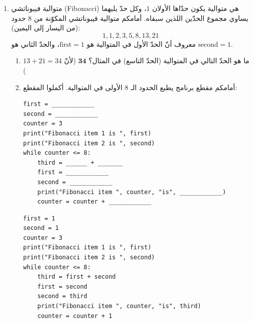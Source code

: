 \documentclass[14pt]{extarticle}
\begin{document}
\begin{enumerate}[label=\textbf{تمرين \arabic*:}, wide=0pt, itemsep=2.2em]
\begin{enumerate}[label=\textbf{مقطع \alph*:}, wide=0pt, itemsep=1.5em]
\end{enumerate}
\filbreak

\item متوالية فيبوناتشي (\textenglish{Fibonacci}) هي متوالية يكون حدّاها الأولان $1$، وكل حدّ يليهما يساوي مجموع الحدّين اللذين سبقاه.
أمامكم متوالية فيبوناتشي المكوّنة من $8$ حدود (من اليسار إلى اليمين):
$$1, 1, 2, 3, 5, 8, 13, 21$$
معروف أنّ الحدّ الأول في المتوالية هو $\text{first} = 1$، والحدّ الثاني هو $\text{second} = 1$.

\begin{enumerate}[label=\alph*.]
\item ما هو الحدّ التالي في المتوالية (الحدّ التاسع) في المثال؟ \ifwithsols $\mathbf{34}$ (لأنّ $13 + 21 = 34$) \else \underline{\hspace{3cm}} \fi
\filbreak

\item أمامكم مقطع برنامج يطبع الحدود الـ $8$ الأولى في المتوالية. أكملوا المقطع:

\begin{boxCode}
\begin{english}
\begin{verbatim}
first = ____________
second = ____________
counter = 3
print("Fibonacci item 1 is ", first)
print("Fibonacci item 2 is ", second)
while counter <= 8:
    third = ______ + _______
    first = ____________
    second = ____________
    print("Fibonacci item ", counter, "is", ____________)
    counter = counter + ____________
\end{verbatim}
\end{english}
\end{boxCode}

\ifwithsols
\begin{boxSolution}
\begin{english}
\begin{verbatim}
first = 1
second = 1
counter = 3
print("Fibonacci item 1 is ", first)
print("Fibonacci item 2 is ", second)
while counter <= 8:
    third = first + second
    first = second
    second = third
    print("Fibonacci item ", counter, "is", third)
    counter = counter + 1
\end{verbatim}
\end{english}
\end{boxSolution}
\fi
\filbreak
\end{enumerate}
\filbreak


\end{enumerate}
\end{document}
